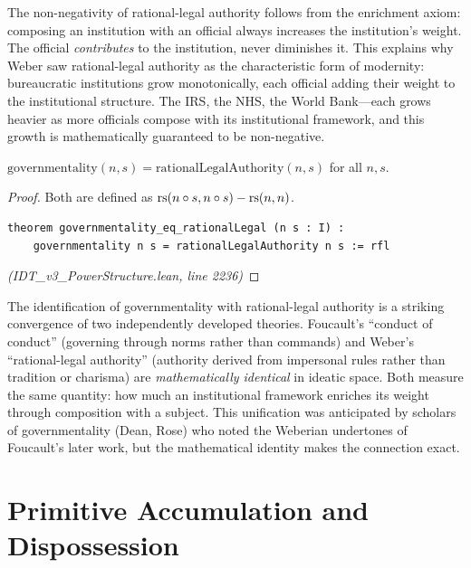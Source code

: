 \begin{remark}
The non-negativity of rational-legal authority follows from the enrichment
axiom: composing an institution with an official always increases the
institution's weight. The official \emph{contributes} to the institution,
never diminishes it. This explains why Weber saw rational-legal authority as
the characteristic form of modernity: bureaucratic institutions grow
monotonically, each official adding their weight to the institutional
structure. The IRS, the NHS, the World Bank---each grows heavier as more
officials compose with its institutional framework, and this growth is
mathematically guaranteed to be non-negative.
\end{remark}

\begin{theorem}
\label{thm:govmentality-rationallegal}
$\mathrm{governmentality}(n, s) = \mathrm{rationalLegalAuthority}(n, s)$
for all $n, s$.
\end{theorem}

\begin{proof}
Both are defined as $\mathrm{rs}(n \circ s, n \circ s) - \mathrm{rs}(n, n)$.
\begin{lstlisting}
theorem governmentality_eq_rationalLegal (n s : I) :
    governmentality n s = rationalLegalAuthority n s := rfl
\end{lstlisting}
\textit{(IDT\_v3\_PowerStructure.lean, line 2236)}
\end{proof}

\begin{interpretation}
The identification of governmentality with rational-legal authority is a
striking convergence of two independently developed theories. Foucault's
``conduct of conduct'' (governing through norms rather than commands) and
Weber's ``rational-legal authority'' (authority derived from impersonal rules
rather than tradition or charisma) are \emph{mathematically identical} in
ideatic space. Both measure the same quantity: how much an institutional
framework enriches its weight through composition with a subject. This
unification was anticipated by scholars of governmentality (Dean, Rose) who
noted the Weberian undertones of Foucault's later work, but the mathematical
identity makes the connection exact.
\end{interpretation}

\section{Primitive Accumulation and Dispossession}


